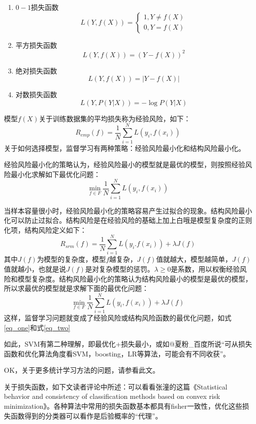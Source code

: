\documentclass[a4paper,12pt]{article}
\begin{document}
\begin{enumerate}[(1)]
    \item $0-1$损失函数
      $$L(Y,f(X))=\left\{\begin{array}{l}1,Y\neq f(X)\\0,Y=f(X)\end{array}\right.$$
    \item 平方损失函数
      $$L(Y,f(X))=(Y-f(X))^2$$
    \item 绝对损失函数
      $$L(Y,f(X))=|Y-f(X)|$$
    \item 对数损失函数
      $$L(Y,P(Y|X))=-\log P(Y|X)$$
\end{enumerate}
模型$f(X)$关于训练数据集的平均损失称为经验风险，如下：
\begin{equation}
  R_{emp}(f)=\frac{1}{N}\sum_{i=1}^NL(y_i,f(x_i))
\end{equation}
关于如何选择模型，监督学习有两种策略：经验风险最小化和结构风险最小化。

经验风险最小化的策略认为，经验风险最小的模型就是最优的模型，则按照经验风险最小化求解如下最优化问题：
\begin{equation}
  \label{eq_one}
  \min_{f\in F}\frac{1}{N}\sum_{i=1}^NL(y_i,f(x_i))
\end{equation}

当样本容量很小时，经验风险最小化的策略容易产生过拟合的现象。结构风险最小化可以防止过拟合。结构风险是在经验风险的基础上加上白哦是模型复杂度的正则化项，结构风险定义如下：
\begin{equation}
  R_{srm}(f)=\frac{1}{N}\sum_{i=1}^NL(y_i.f(x_i))+\lambda J(f)
\end{equation}
其中$J(f)$为模型的复杂度，模型$f$越复杂，$J(f)$值就越大，模型越简单，$J(f)$值就越小，也就是说$J(f)$是对复杂模型的惩罚。$\lambda\geq0$是系数，用以权衡经验风险和模型复杂度。结构风险最小化的策略认为结构风险最小的模型是最优的模型，所以求最优的模型就是求解下面的最优化问题：
\begin{equation}\label{eq_two}
  \min_{f\in F}\frac{1}{N}\sum_{i=1}^NL(y_i,f(x_i))+\lambda J(f)
\end{equation}
这样，监督学习问题就变成了经验风险或结构风险函数的最优化问题，如式\ref{eq_one}和式\ref{eq_two}

如此，SVM有第二种理解，即最优化+损失最小，或如@夏粉\_百度所说“可从损失函数和优化算法角度看SVM，boosting，LR等算法，可能会有不同收获”。

OK，关于更多统计学习方法的问题，请参看此文。

关于损失函数，如下文读者评论中所述：可以看看张潼的这篇《Statistical behavior and consistency of classification methods based on convex risk minimization》。各种算法中常用的损失函数基本都具有fisher一致性，优化这些损失函数得到的分类器可以看作是后验概率的“代理”。
\end{document}
